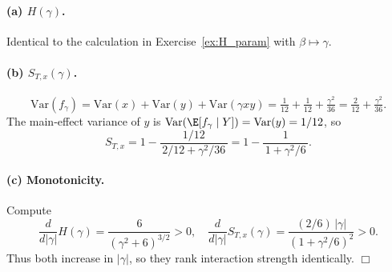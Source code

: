 {\paragraph{(a) $H(\gamma)$.}
Identical to the calculation in Exercise~\ref{ex:H_param} with
$\beta\mapsto\gamma$.

\paragraph{(b) $S_{T,x}(\gamma)$.}
\[
\text{Var}(f_\gamma)
= \text{Var}(x)+\text{Var}(y)+\text{Var}(\gamma xy)
= \tfrac1{12}+\tfrac1{12}+\tfrac{\gamma^2}{36}
= \tfrac{2}{12} + \tfrac{\gamma^2}{36}.
\]
The main‐effect variance of $y$ is $\text{Var}(\E[f_\gamma\mid Y])=\text{Var}(y)=1/12$, so
\[
S_{T,x} = 1 - \frac{1/12}{\,2/12 + \gamma^2/36\,}
= 1 - \frac{1}{\,1 + \gamma^2/6\,}.
\]

\paragraph{(c) Monotonicity.}
Compute
\[
\frac{d}{d|\gamma|}H(\gamma)
= \frac{6}{(\gamma^2+6)^{3/2}}>0,
\quad
\frac{d}{d|\gamma|}S_{T,x}(\gamma)
= \frac{(2/6)\,|\gamma|}{(1+\gamma^2/6)^2}>0.
\]
Thus both increase in $|\gamma|$, so they rank interaction strength
identically.  \hfill\(\Box\)

}
